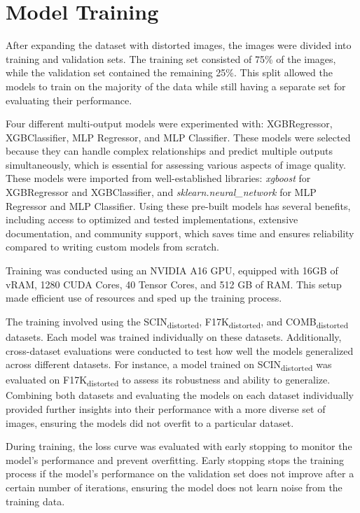 \section{Model Training}
\label{sec:ModelTraining}
After expanding the dataset with distorted images, the images were divided into training and validation sets. The training set consisted of 75\% of the images, while the validation set contained the remaining 25\%. This split allowed the models to train on the majority of the data while still having a separate set for evaluating their performance.  \par
\vspace{\baselineskip}
\noindent
Four different multi-output models were experimented with: XGBRegressor, XGBClassifier, MLP Regressor, and MLP Classifier. These models were selected because they can handle complex relationships and predict multiple outputs simultaneously, which is essential for assessing various aspects of image quality. These models were imported from well-established libraries: \textit{xgboost} for XGBRegressor and XGBClassifier, and \textit{sklearn.neural\_network} for MLP Regressor and MLP Classifier. Using these pre-built models has several benefits, including access to optimized and tested implementations, extensive documentation, and community support, which saves time and ensures reliability compared to writing custom models from scratch. \par
\vspace{\baselineskip}
\noindent
Training was conducted using an NVIDIA A16 GPU, equipped with 16GB of vRAM, 1280 CUDA Cores, 40 Tensor Cores, and 512 GB of RAM. This setup made efficient use of resources and sped up the training process. \par
\vspace{\baselineskip}
\noindent
The training involved using the SCIN\textsubscript{distorted}, F17K\textsubscript{distorted}, and COMB\textsubscript{distorted} datasets. Each model was trained individually on these datasets. Additionally, cross-dataset evaluations were conducted to test how well the models generalized across different datasets. For instance, a model trained on SCIN\textsubscript{distorted} was evaluated on F17K\textsubscript{distorted} to assess its robustness and ability to generalize. Combining both datasets and evaluating the models on each dataset individually provided further insights into their performance with a more diverse set of images, ensuring the models did not overfit to a particular dataset. \par
\vspace{\baselineskip}
\noindent
During training, the loss curve was evaluated with early stopping to monitor the model’s performance and prevent overfitting. Early stopping stops the training process if the model’s performance on the validation set does not improve after a certain number of iterations, ensuring the model does not learn noise from the training data. \par

